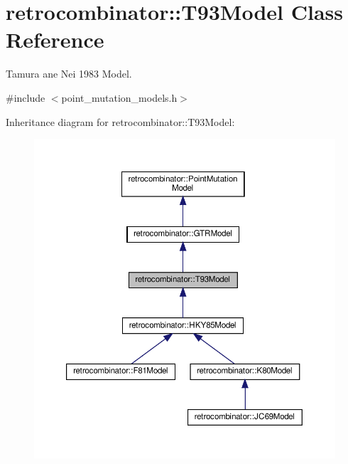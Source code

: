 \hypertarget{classretrocombinator_1_1T93Model}{}\section{retrocombinator\+:\+:T93\+Model Class Reference}
\label{classretrocombinator_1_1T93Model}


Tamura ane Nei 1983 Model.  




{\ttfamily \#include $<$point\+\_\+mutation\+\_\+models.\+h$>$}



Inheritance diagram for retrocombinator\+:\+:T93\+Model\+:\nopagebreak
\begin{figure}[H]
\begin{center}
\leavevmode
\includegraphics[width=350pt]{classretrocombinator_1_1T93Model__inherit__graph}
\end{center}
\end{figure}


